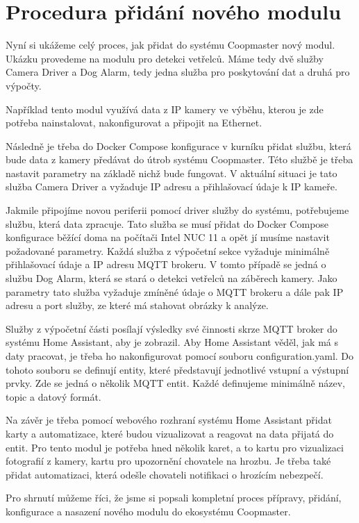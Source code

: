\section*{Procedura přidání nového modulu}


Nyní si ukážeme celý proces, jak přidat do systému Coopmaster nový modul.
Ukázku provedeme na modulu pro detekci vetřelců.
Máme tedy dvě služby Camera Driver a Dog Alarm, tedy jedna služba pro poskytování dat a druhá pro výpočty.\newline

Například tento modul využívá data z IP kamery ve výběhu, kterou je zde potřeba nainstalovat, nakonfigurovat a připojit na Ethernet.\newline

Následně je třeba do Docker Compose konfigurace v kurníku přidat službu, která bude data z kamery předávat do útrob systému Coopmaster.
Této službě je třeba nastavit parametry na základě nichž bude fungovat.
V aktuální situaci je tato služba Camera Driver a vyžaduje IP adresu a přihlašovací údaje k IP kameře.\newline

Jakmile připojíme novou periferii pomocí driver služby do systému, potřebujeme službu, která data zpracuje.
Tato služba se musí přidat do Docker Compose konfigurace běžící doma na počítači Intel NUC 11 a opět jí musíme nastavit požadované parametry.
Každá služba z výpočetní sekce vyžaduje minimálně přihlašovací údaje a IP adresu MQTT brokeru.
V tomto případě se jedná o službu Dog Alarm, která se stará o detekci vetřelců na záběrech kamery.
Jako parametry tato služba vyžaduje zmíněné údaje o MQTT brokeru a dále pak IP adresu a port služby, ze které má stahovat obrázky k analýze.\newline

Služby z výpočetní části posílají výsledky své činnosti skrze MQTT broker do systému Home Assistant, aby je zobrazil.
Aby Home Assistant věděl, jak má s daty pracovat, je třeba ho nakonfigurovat pomocí souboru configuration.yaml.
Do tohoto souboru se definují entity, které představují jednotlivé vstupní a výstupní prvky.
Zde se jedná o několik MQTT entit.
Každé definujeme minimálně název, topic a datový formát.\newline

Na závěr je třeba pomocí webového rozhraní systému Home Assistant přidat karty a automatizace, které budou vizualizovat a reagovat na data přijatá do entit.
Pro tento modul je potřeba hned několik karet, a to kartu pro vizualizaci fotografií z kamery, kartu pro upozornění chovatele na hrozbu.
Je třeba také přidat automatizaci, která odešle chovateli notifikaci o hrozícím nebezpečí.\newline

Pro shrnutí můžeme říci, že jsme si popsali kompletní proces přípravy, přidání, konfigurace a nasazení nového modulu do ekosystému Coopmaster.




